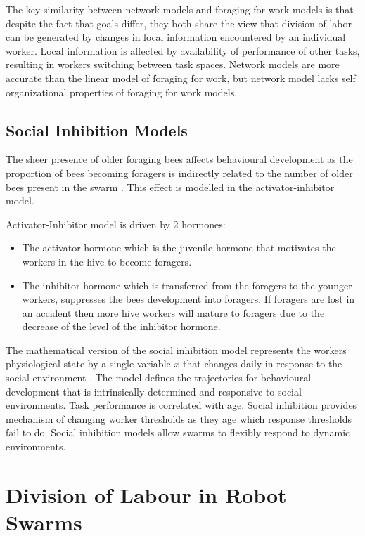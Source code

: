The key similarity between network models and foraging for work models is that despite the fact that goals differ, they both share the view that division of labor can be generated by changes in local information encountered by an individual worker. Local information is affected by availability of performance of other tasks, resulting in workers switching between task spaces. Network models are more accurate than the linear model of foraging for work, but network model lacks self organizational properties of foraging for work models.

\subsection{Social Inhibition Models}

The sheer presence of older foraging bees affects behavioural development as the proportion of bees becoming foragers is indirectly related to the number of older bees present in the swarm . This effect is modelled in the activator-inhibitor model.

Activator-Inhibitor model is driven by 2 hormones:
\begin{itemize}
	\item The activator hormone which is the juvenile hormone that motivates the workers in the hive to become foragers.
	\item The inhibitor hormone which is transferred from the foragers to the younger workers, suppresses the bees development into foragers. If foragers are lost in an accident then more hive workers will mature to foragers due to the decrease of the level of the inhibitor hormone.
\end{itemize}

The mathematical version of the social inhibition model represents the workers physiological state by a single variable $x$ that changes daily in response to the social environment \cite{beshers2001social}. The model defines the trajectories for behavioural development that is intrinsically determined and responsive to social environments. Task performance is correlated with age. Social inhibition provides mechanism of changing worker thresholds as they age which response thresholds fail to do. Social inhibition models allow swarms to flexibly respond to dynamic environments. %

\section{Division of Labour in Robot Swarms}

